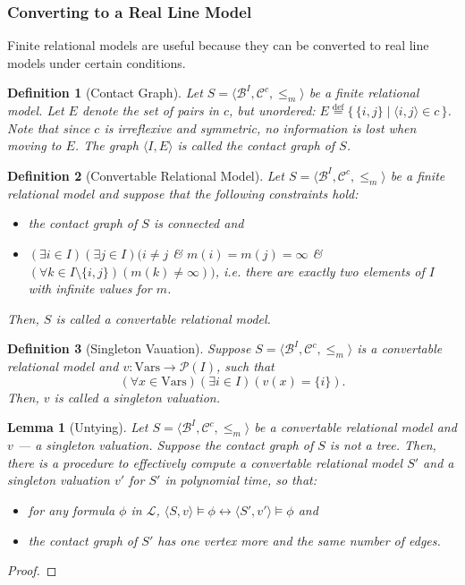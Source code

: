 \documentclass{article}
\newtheorem*{definition}{Definition}
\newtheorem*{lemma}{Lemma}
\newcommand{\pwrset}{\mathcal{P}}
\newcommand{\B}{\mathcal{B}}
\newcommand{\lang}{\mathcal{L}}
\newcommand{\Vars}{\text{Vars}}
\newcommand{\eqdef}{\stackrel{\text{def}}{=}}
\begin{document}
\subsubsection{Converting to a Real Line Model}
Finite relational models are useful because they can be converted to real line models under certain conditions.
\begin{definition}[Contact Graph]
  Let $S = \langle \B^I, \mathcal{C}^c, \leq_m \rangle$ be a finite relational model. Let $E$ denote the set of pairs in $c$, but unordered: $E \eqdef \{\, \{i, j\} \mid \langle i, j \rangle \in c \,\}$. Note that since $c$ is irreflexive and symmetric, no information is lost when moving to $E$.
  The graph $\langle I, E \rangle$ is called the \emph{contact graph} of $S$.
\end{definition}
\begin{definition}[Convertable Relational Model]
Let $S = \langle \B^I, \mathcal{C}^c, \leq_m \rangle$ be a finite relational model and suppose that the following constraints hold:
\begin{itemize}
\item the contact graph of $S$ is connected and
\item $(\exists i \in I)(\exists j \in I)(i \neq j$ \& $m(i) = m(j) = \infty$ \& $(\forall k \in I\setminus\{i, j\})(m(k) \neq \infty))$, i.e. there are exactly two elements of $I$ with infinite values for $m$.
\end{itemize}
Then, $S$ is called a \emph{convertable relational model}.
\end{definition}

\begin{definition}[Singleton Vauation]
  Suppose $S = \langle \B^I, \mathcal{C}^c, \leq_m \rangle$ is a convertable relational model and $v: \Vars \rightarrow \pwrset(I)$, such that
\begin{equation*}
(\forall x \in \Vars)(\exists i \in I)(v(x) = \{i\}).
\end{equation*}
Then, $v$ is called a \emph{singleton valuation}.
\end{definition}

\begin{lemma}[Untying]
  Let $S = \langle \B^I, \mathcal{C}^c, \leq_m \rangle$ be a convertable relational model and $v$ --- a singleton valuation. Suppose the contact graph of $S$ is not a tree.
  Then, there is a procedure to effectively compute a convertable relational model $S'$ and a singleton valuation $v'$ for $S'$ in polynomial time, so that:
  \begin{itemize}
  \item for any formula $\phi$ in $\lang$, $\langle S, v \rangle \models \phi \longleftrightarrow \langle S', v' \rangle \models \phi$ and
  \item the contact graph of $S'$ has one vertex more and the same number of edges.
  \end{itemize}
\end{lemma}
\begin{proof}
\end{proof}
\end{document}
